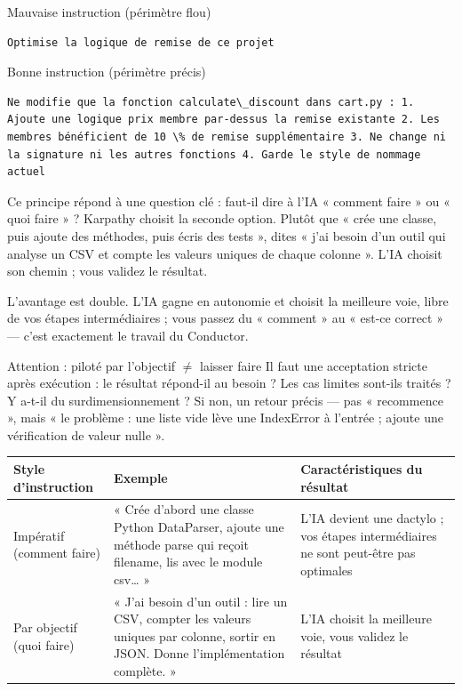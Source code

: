 Mauvaise instruction (périmètre flou)

\begin{lstlisting}
Optimise la logique de remise de ce projet
\end{lstlisting}

Bonne instruction (périmètre précis)

\begin{lstlisting}
Ne modifie que la fonction calculate\_discount dans cart.py : 1. Ajoute une logique prix membre par-dessus la remise existante 2. Les membres bénéficient de 10 \% de remise supplémentaire 3. Ne change ni la signature ni les autres fonctions 4. Garde le style de nommage actuel
\end{lstlisting}


Ce principe répond à une question clé : faut-il dire à l'IA « comment faire » ou « quoi faire » ? Karpathy choisit la seconde option. Plutôt que « crée une classe, puis ajoute des méthodes, puis écris des tests », dites « j'ai besoin d'un outil qui analyse un CSV et compte les valeurs uniques de chaque colonne ». L'IA choisit son chemin ; vous validez le résultat.

L'avantage est double. L'IA gagne en autonomie et choisit la meilleure voie, libre de vos étapes intermédiaires ; vous passez du « comment » au « est-ce correct » — c'est exactement le travail du Conductor.

\begin{tcbwarn}{Attention : piloté par l'objectif $\neq$ laisser faire}
Il faut une acceptation stricte après exécution : le résultat répond-il au besoin ? Les cas limites sont-ils traités ? Y a-t-il du surdimensionnement ? Si non, un retour précis — pas « recommence », mais « le problème : une liste vide lève une IndexError à l'entrée ; ajoute une vérification de valeur nulle ».

\end{tcbwarn}

\begin{center}
\begin{tabularx}{\linewidth}{|X|X|X|}
\hline
\textbf{Style d'instruction} & \textbf{Exemple} & \textbf{Caractéristiques du résultat} \tabularnewline
\hline
Impératif (comment faire) & « Crée d'abord une classe Python DataParser, ajoute une méthode parse qui reçoit filename, lis avec le module csv… » & L'IA devient une dactylo ; vos étapes intermédiaires ne sont peut-être pas optimales \tabularnewline
Par objectif (quoi faire) & « J'ai besoin d'un outil : lire un CSV, compter les valeurs uniques par colonne, sortir en JSON. Donne l'implémentation complète. » & L'IA choisit la meilleure voie, vous validez le résultat \tabularnewline
\hline
\end{tabularx}
\end{center}


